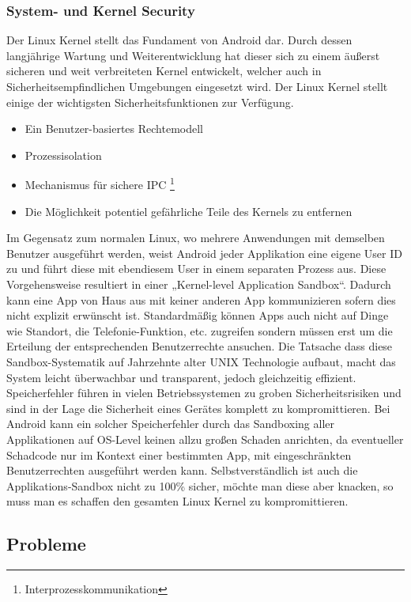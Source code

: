 \subsubsection{System- und Kernel Security}
Der Linux Kernel stellt das Fundament von Android dar. Durch dessen langjährige Wartung und Weiterentwicklung hat dieser sich zu einem äußerst sicheren und weit verbreiteten Kernel entwickelt, welcher auch in Sicherheitsempfindlichen Umgebungen eingesetzt wird.\newline
Der Linux Kernel stellt einige der wichtigsten Sicherheitsfunktionen zur Verfügung.
\begin{itemize}
	\item Ein Benutzer-basiertes Rechtemodell
	\item Prozessisolation
	\item Mechanismus für sichere IPC \footnote{Interprozesskommunikation} 
	\item Die Möglichkeit potentiel gefährliche Teile des Kernels zu entfernen
\end{itemize}
Im Gegensatz zum normalen Linux, wo mehrere Anwendungen mit demselben Benutzer ausgeführt werden, weist Android jeder Applikation eine eigene User ID zu und führt diese mit ebendiesem User in einem separaten Prozess aus.
Diese Vorgehensweise resultiert in einer „Kernel-level Application Sandbox“. Dadurch kann eine App von Haus aus mit keiner anderen App kommunizieren sofern dies nicht explizit erwünscht ist. Standardmäßig können Apps auch nicht auf Dinge wie Standort, die Telefonie-Funktion, etc. zugreifen sondern müssen erst um die Erteilung der entsprechenden Benutzerrechte ansuchen. Die Tatsache dass diese Sandbox-Systematik auf Jahrzehnte alter UNIX Technologie aufbaut, macht das System leicht überwachbar und transparent, jedoch gleichzeitig effizient. \newline
Speicherfehler führen in vielen Betriebssystemen zu groben Sicherheitsrisiken und sind in der Lage die Sicherheit eines Gerätes komplett zu kompromittieren. Bei Android kann ein solcher Speicherfehler durch das Sandboxing aller Applikationen auf OS-Level keinen allzu großen Schaden anrichten, da eventueller Schadcode nur im Kontext einer bestimmten App, mit eingeschränkten Benutzerrechten ausgeführt werden kann.
Selbstverständlich ist auch die Applikations-Sandbox nicht zu 100\% sicher, möchte man diese aber knacken, so muss man es schaffen den gesamten Linux Kernel zu kompromittieren.
	

\subsection{Probleme}